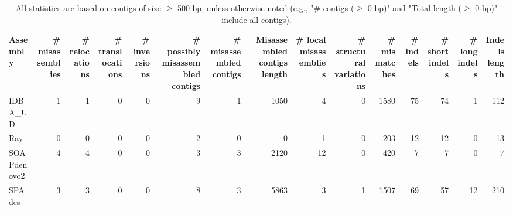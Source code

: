 \documentclass[12pt,a4paper]{article}
\begin{document}
\begin{table}[ht]
\begin{center}
\caption{All statistics are based on contigs of size $\geq$ 500 bp, unless otherwise noted (e.g., "\# contigs ($\geq$ 0 bp)" and "Total length ($\geq$ 0 bp)" include all contigs).}
\begin{tabular}{|l*{14}{|r}|}
\hline
Assembly & \# misassemblies &     \# relocations &     \# translocations &     \# inversions & \# possibly misassembled contigs & \# misassembled contigs & Misassembled contigs length & \# local misassemblies & \# structural variations & \# mismatches & \# indels &     \# short indels &     \# long indels & Indels length \\ \hline
IDBA\_UD & 1 & 1 & 0 & 0 & 9 & 1 & 1050 & 4 & 0 & 1580 & 75 & 74 & 1 & 112 \\ \hline
Ray & 0 & 0 & 0 & 0 & 2 & 0 & 0 & 1 & 0 & 203 & 12 & 12 & 0 & 13 \\ \hline
SOAPdenovo2 & 4 & 4 & 0 & 0 & 3 & 3 & 2120 & 12 & 0 & 420 & 7 & 7 & 0 & 7 \\ \hline
SPAdes & 3 & 3 & 0 & 0 & 8 & 3 & 5863 & 3 & 1 & 1507 & 69 & 57 & 12 & 210 \\ \hline
\end{tabular}
\end{center}
\end{table}
\end{document}
